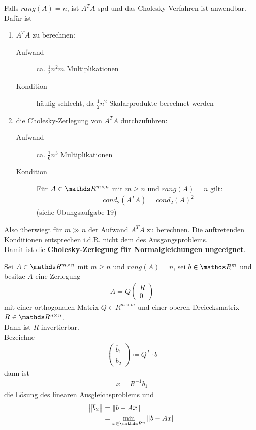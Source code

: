 Falls $rang(A) = n$, ist $A^TA$ spd und das Cholesky-Verfahren ist anwendbar. \\
Dafür ist
\begin{enumerate}[1.]
\item $A^TA$ zu berechnen:
  \begin{description}
  \item[Aufwand] ca. $\frac{1}{2}n^2m$ Multiplikationen 
  \item[Kondition] häufig schlecht, da $\frac{1}{2}n^2$ Skalarprodukte berechnet werden
  \end{description}
\item die Cholesky-Zerlegung von $A^TA $ durchzuführen:
  \begin{description}
  \item[Aufwand] ca. $\frac{1}{6}n^3$ Multiplikationen 
  \item[Kondition] Für $A\in\R^{m\times n}$ mit $m\geq n$ und $rang(A)=n$ gilt:
    \begin{gather}
      cond_2(A^TA) = cond_2(A)^2 \label{IV.3.7}
    \end{gather}
    (siehe Übungsaufgabe 19)
  \end{description}
\end{enumerate}
Also überwiegt für $m\gg n$ der Aufwand $A^TA$ zu berechnen.
Die auftretenden Konditionen entsprechen i.d.R. nicht dem des Ausgangsproblems.\\
Damit ist die 
\textbf{Cholesky-Zerlegung  für Normalgleichungen ungeeignet}.


\begin{Satze}
  Sei $A\in \R^{m\times n} $ mit $m\geq n$ und $rang(A) = n$,
  sei $b\in\R^m$ und besitze $A$ eine Zerlegung
  \begin{gather*}
    A= Q\begin{pmatrix}R\\0\end{pmatrix}
  \end{gather*}
  mit einer orthogonalen Matrix $Q\in R^{m\times m}$ und 
  einer oberen Dreiecksmatrix $R\in \R^{n\times n}$. \\
  Dann ist $R$ invertierbar. \\
  Bezeichne 
  \begin{gather}
    \begin{pmatrix} \overline{b}_1 \\ \overline{b}_2\end{pmatrix}
    \coloneqq Q^T\cdot b
    \label{IV.3.9}
  \end{gather}
  dann ist
  \begin{gather}
    \overline{x} = R^{-1} \overline{b}_1 
    \label{IV.3.10}
  \end{gather}
  die Lösung des linearen Ausgleichsproblems und
  \begin{align*}
    \nn[\overline{b}_2] &= \nn[b-A\overline{x}] \\
                        & = \min_{x\in \Ren }\nn[b-Ax]
  \end{align*}
\end{Satze}

